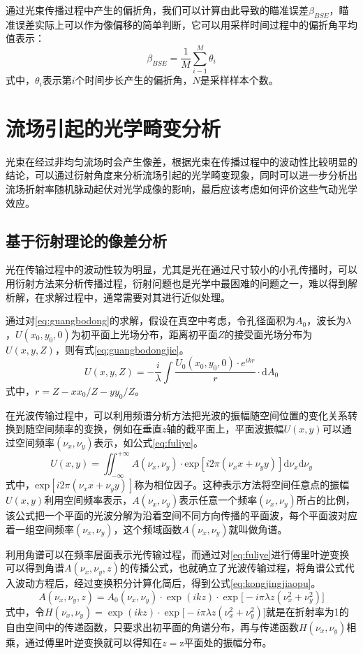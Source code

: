 通过光束传播过程中产生的偏折角，我们可以计算由此导致的瞄准误差$\beta_{BSE}$，瞄准误差实际上可以作为像偏移的简单判断，它可以用采样时间过程中的偏折角平均值表示：
\begin{equation}
\beta_{BSE}=\frac{1}{M}\sum\limits_{i-1}^{M}\theta_i
\end{equation}
式中，$\theta_i$表示第$i$个时间步长产生的偏折角，$N$是采样样本个数。
\section{流场引起的光学畸变分析}
光束在经过非均匀流场时会产生像差，根据光束在传播过程中的波动性比较明显的结论，可以通过衍射角度来分析流场引起的光学畸变现象，同时可以进一步分析出流场折射率随机脉动起伏对光学成像的影响，最后应该考虑如何评价这些气动光学效应。
\subsection{基于衍射理论的像差分析}
光在传输过程中的波动性较为明显，尤其是光在通过尺寸较小的小孔传播时，可以用衍射方法来分析传播过程，衍射问题也是光学中最困难的问题之一，难以得到解析解，在求解过程中，通常需要对其进行近似处理。

通过对\eqref{eq:guangbodong}的求解，假设在真空中考虑，令孔径面积为$A_0$，波长为$\lambda$，$U(x_0,y_0,0)$为初平面上光场分布，距离初平面$Z$的接受面光场分布为$U(x,y,Z)$，则有式\eqref{eq:guangbodongjie}。
\begin{equation}
U(x,y,Z)=-\frac{i}{\lambda}\int\frac{U_0(x_0,y_0,0)\cdot e^{ikr}}{r}\cdot\text{d}A_0
\label{eq:guangbodongjie}
\end{equation}
式中，$r=Z-xx_0/Z-yy_0/Z$。

在光波传输过程中，可以利用频谱分析方法把光波的振幅随空间位置的变化关系转换到随空间频率的变换，例如在垂直$z$轴的截平面上，平面波振幅$U(x,y)$可以通过空间频率$(\nu_x,\nu_y)$表示，如公式\eqref{eq:fuliye}。
\begin{equation}
U(x,y)=\iint_{-\infty}^{+\infty}A(\nu_x,\nu_y)\cdot\text{exp}[i2\pi(\nu_xx+\nu_yy)]\text{d}\nu_x\text{d}\nu_y
\label{eq:fuliye}
\end{equation}
式中，$\text{exp}[i2\pi(\nu_xx+\nu_yy)]$称为相位因子。这种表示方法将空间任意点的振幅$U(x,y)$利用空间频率表示，$A(\nu_x,\nu_y)$表示任意一个频率$(\nu_x,\nu_y)$所占的比例，该公式把一个平面的光波分解为沿着空间不同方向传播的平面波，每个平面波对应着一组空间频率$(\nu_x,\nu_y)$，这个频域函数$A(\nu_x,\nu_y)$就叫做角谱。

利用角谱可以在频率层面表示光传输过程，而通过对\eqref{eq:fuliye}进行傅里叶逆变换可以得到角谱$A(\nu_x,\nu_y,z)$的传播公式，也就确立了光波传输过程，将角谱公式代入波动方程后，经过变换积分计算化简后，得到公式\eqref{eq:kongjingjiaopu}。
\begin{equation}
A(\nu_x,\nu_y,z)=A_0(\nu_x,\nu_y)\cdot\exp(ikz)\cdot\exp\big[-i\pi\lambda z(\nu_x^2+\nu_y^2)\big]
\label{eq:kongjingjiaopu}
\end{equation}
式中，令$H(\nu_x,\nu_y)=\exp(ikz)\cdot\exp\big[-i\pi\lambda z(\nu_x^2+\nu_y^2)\big]$就是在折射率为1的自由空间中的传递函数，只要求出初平面的角谱分布，再与传递函数$H(\nu_x,\nu_y)$相乘，通过傅里叶逆变换就可以得知在$z=$z平面处的振幅分布。

